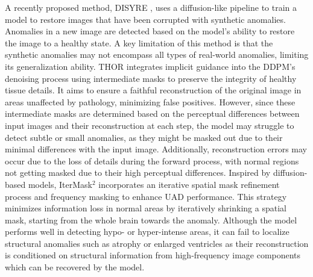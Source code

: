 A recently proposed method, DISYRE \cite{naval_marimont2024disyre,naval2024ensembled}, uses a diffusion-like pipeline to train a model to restore images that have been corrupted with synthetic anomalies. Anomalies in a new image are detected based on the model's ability to restore the image to a healthy state. A key limitation of this method is that the synthetic anomalies may not encompass all types of real-world anomalies, limiting its generalization ability. THOR \cite{bercea2024diffusion} integrates implicit guidance into the DDPM's denoising process using intermediate masks to preserve the integrity of healthy tissue details. It aims to ensure a faithful reconstruction of the original image in areas unaffected by pathology, minimizing false positives. However, since these intermediate masks are determined based on the perceptual differences between input images and their reconstruction at each step, the model may struggle to detect subtle or small anomalies, as they might be masked out due to their minimal differences with the input image. Additionally, reconstruction errors may occur due to the loss of details during the forward process, with normal regions not getting masked due to their high perceptual differences. Inspired by diffusion-based models, IterMask$^2$ \cite{liang2024itermask2} incorporates an iterative spatial mask refinement process and frequency masking to enhance UAD performance. This strategy minimizes information loss in normal areas by iteratively shrinking a spatial mask, starting from the whole brain towards the anomaly. Although the model performs well in detecting hypo- or hyper-intense areas, it can fail to localize structural anomalies such as atrophy or enlarged ventricles as their reconstruction is conditioned on structural information from high-frequency image components which can be recovered by the model.
